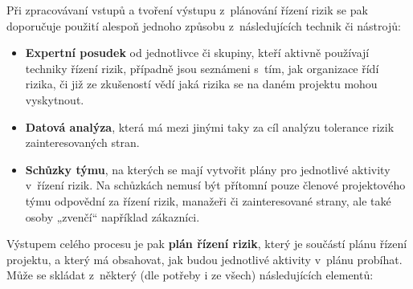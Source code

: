 Při zpracovávaní vstupů a tvoření výstupu z~plánování řízení rizik se pak doporučuje použití alespoň jednoho způsobu z~následujících technik či nástrojů:

\begin{itemize}
    \item \textbf{Expertní posudek} od jednotlivce či skupiny, kteří aktivně používají techniky řízení rizik, případně jsou seznámeni s~tím, jak organizace řídí rizika, či již ze zkušeností vědí jaká rizika se na daném projektu mohou vyskytnout. 
    \item \textbf{Datová analýza}, která má mezi jinými taky za cíl analýzu tolerance rizik zainteresovaných stran.
    \item \textbf{Schůzky týmu}, na kterých se mají vytvořit plány pro jednotlivé aktivity v~řízení rizik. Na schůzkách nemusí být přítomní pouze členové projektového týmu odpovědní za řízení rizik, manažeři či zainteresované strany, ale také osoby „zvenčí“ například zákazníci. 
\end{itemize}

Výstupem celého procesu je pak \textbf{plán řízení rizik}, který je součástí plánu řízení projektu, a který má obsahovat, jak budou jednotlivé aktivity v~plánu probíhat.  Může se skládat z~některý (dle potřeby i ze všech) následujících elementů:


